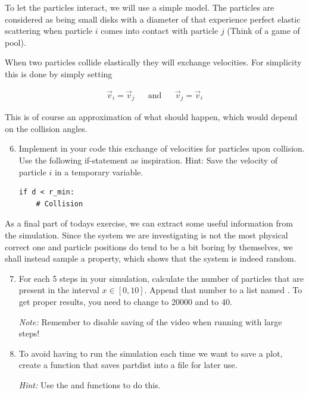\documentclass{article}
\begin{document}
To let the particles interact, we will use a simple model.
The particles are considered as being small disks with a diameter of  that experience perfect elastic scattering when particle $i$ comes into contact with particle $j$
(Think of a game of pool).

When two particles collide elastically they will exchange velocities.
For simplicity this is done by simply setting

\begin{align}
  \vec{v}_i = \vec{v}_j & & \text{and} & & \vec{v}_j = \vec{v}_i
\end{align}

This is of course an approximation of what should happen, which would depend on the collision angles.

\begin{enumerate}
  \setcounter{enumi}{5}
  \item Implement in your code this exchange of velocities for particles upon collision.
      Use the following if-statement as inspiration.
      {Hint:} Save the velocity of particle $i$ in a temporary variable.

\begin{lstlisting}
if d < r_min:
    # Collision
\end{lstlisting}

\end{enumerate}

As a final part of todays exercise, we can extract some useful information from the simulation.
Since the system we are investigating is not the most physical correct one and particle positions do tend to be a bit boring by themselves, we shall instead sample a property, which shows that the system is indeed random.

\begin{enumerate}
  \setcounter{enumi}{6}
  \item For each 5 steps in your simulation, calculate the number of particles
    that are present in the interval $x \in [0, 10]$.
    Append that number to a list named .
    To get proper results, you need to change  to 20000 and  to 40.

    {\em Note:} Remember to disable saving of the video when running with large steps!

    \item To avoid having to run the simulation each time we want to save a plot, create a function that saves partdist into a file for later use.

    {\em Hint:} Use the  and  functions to do this.

\end{enumerate}
\end{document}
